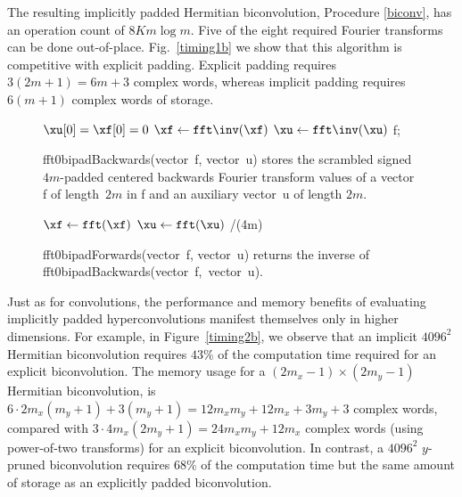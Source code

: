 \documentclass[final]{siamltex}
\begin{document}
The resulting implicitly padded Hermitian biconvolution,
Procedure \ref{biconv}, has an operation count of $8Km\log m$. 
Five of the eight required Fourier transforms can be done out-of-place.
Fig.~\ref{timing1b} we show that this algorithm is competitive with
explicit padding. Explicit padding requires $3(2m+1)=6m+3$ complex words,
whereas implicit padding requires $6(m+1)$ complex words of storage.

\begin{figure}[htbp]
\begin{minipage}{0.51\linewidth}
\begin{procedure}[H]
  $\xu[0]=\xf[0]=0$\;
  $\xf \leftarrow \fft\inv(\xf)$\;
  $\xu \leftarrow \fft\inv(\xu)$\;
  \Return f;
  \caption{fft0bipadBackwards(vector~{\sf f}, vector~{\sf u}) stores the 
scrambled signed~$4m$-padded centered backwards Fourier transform values of a
vector {\sf f} of length~$2m$ in {\sf f} and an auxiliary vector~{\sf u} of
length $2m$.}\label{fft0bipadBackwards}
\end{procedure}
\end{minipage}
%
\begin{minipage}{0.49\linewidth}
\begin{function}[H]
  $\xf \leftarrow \fft(\xf)$\;
  $\xu \leftarrow \fft(\xu)$\;
  \Return \xf/(4m)\;
  \caption{fft0bipadForwards(vector~{\sf f}, vector~{\sf u}) returns the
inverse of fft0bipadBackwards(\hbox{vector~{\sf f}, vector~{\sf u}}).}
\label{fft0bipadForwards}
\end{function}
\end{minipage}
\end{figure}

Just as for convolutions, the performance and memory benefits of
evaluating implicitly padded hyperconvolutions manifest themselves only in
higher dimensions. For example, in Figure~\ref{timing2b}, we observe 
that an implicit $4096^2$ Hermitian biconvolution requires $43\%$
of the computation time required for an explicit biconvolution.
The memory usage for a $(2m_x-1)\times (2m_y-1)$ Hermitian biconvolution,
is $6\cdot 2m_x(m_y+1)+3(m_y+1)=12m_xm_y+12m_x+3m_y+3$ complex words,
compared with $3\cdot 4m_x(2m_y+1)=24m_xm_y+12m_x$ complex words
(using power-of-two transforms) for an explicit biconvolution. In contrast, a
$4096^2$ $y$-pruned biconvolution requires $68\%$ of the
computation time but the same amount of storage as an explicitly padded
biconvolution.
\end{document}
